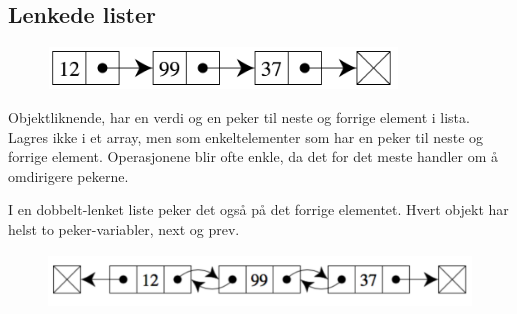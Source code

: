 \documentclass[12pt]{report}
\begin{document}
\vspace{\baselineskip}

\vspace{\baselineskip}

\vspace{\baselineskip}

\vspace{\baselineskip}

\vspace{\baselineskip}

\vspace{\baselineskip}

\vspace{\baselineskip}\subsection*{Lenkede lister}



\begin{figure}[H]
	\begin{Center}
		\includegraphics[width=3.65in,height=0.44in]{./media/image13.png}
	\end{Center}
\end{figure}



Objektliknende, har en verdi og en peker til neste og forrige element i lista. Lagres ikke i et array, men som enkeltelementer som har en peker til neste og forrige element. Operasjonene blir ofte enkle, da det for det meste handler om å omdirigere pekerne.\par

I en dobbelt-lenket liste peker det også på det forrige elementet. Hvert objekt har helst to peker-variabler, next og prev. \par




\begin{figure}[H]
	\begin{Center}
		\includegraphics[width=4.83in,height=0.57in]{./media/image14.png}
	\end{Center}
\end{figure}
\end{document}

